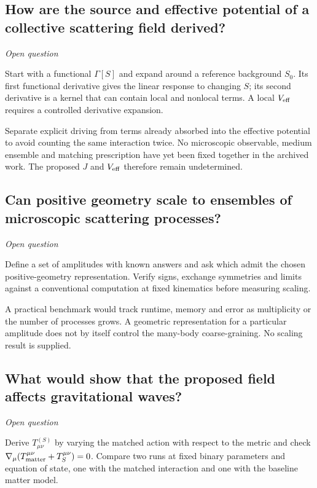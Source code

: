 \documentclass[11pt]{article}
\begin{document}
\subsection{How are the source and effective potential of a collective scattering field derived?}
\label{problem:collective-matching}
\textit{Open question}

Start with a functional \(\Gamma[S]\) and expand around a reference background \(S_0\). Its first functional derivative gives the linear response to changing \(S\); its second derivative is a kernel that can contain local and nonlocal terms. A local \(V_{\rm eff}\) requires a controlled derivative expansion.

Separate explicit driving from terms already absorbed into the effective potential to avoid counting the same interaction twice. No microscopic observable, medium ensemble and matching prescription have yet been fixed together in the archived work. The proposed \(J\) and \(V_{\rm eff}\) therefore remain undetermined.

\subsection{Can positive geometry scale to ensembles of microscopic scattering processes?}
\label{problem:collective-scale}
\textit{Open question}

Define a set of amplitudes with known answers and ask which admit the chosen positive-geometry representation. Verify signs, exchange symmetries and limits against a conventional computation at fixed kinematics before measuring scaling.

A practical benchmark would track runtime, memory and error as multiplicity or the number of processes grows. A geometric representation for a particular amplitude does not by itself control the many-body coarse-graining. No scaling result is supplied.

\subsection{What would show that the proposed field affects gravitational waves?}
\label{problem:collective-observable}
\textit{Open question}

Derive \(T^{(S)}_{\mu\nu}\) by varying the matched action with respect to the metric and check \(\nabla_\mu(T^{\mu\nu}_{\rm matter}+T^{\mu\nu}_{S})=0\). Compare two runs at fixed binary parameters and equation of state, one with the matched interaction and one with the baseline matter model.
\end{document}
